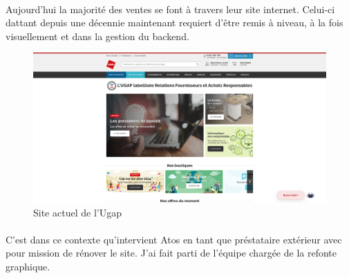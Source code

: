 \documentclass[12pt]{article}
\begin{document}
\begin {sloppypar}
\paragraph{}
Aujourd'hui la majorité des ventes se font à travers leur site internet. Celui-ci dattant depuis une décennie 
maintenant requiert d'être remis à niveau, à la fois visuellement et dans la gestion du backend. 
\newpage
\begin{figure}
  \includegraphics[width=\textwidth] {sc_ugap.png}
  \caption {Site actuel de l'Ugap}
\end{figure}
\paragraph{}
C'est dans ce contexte qu'intervient Atos en tant que préstataire extérieur avec pour mission de 
rénover le site. J'ai fait parti de l'équipe chargée de la refonte graphique. 

\end{sloppypar}
\end{document}
